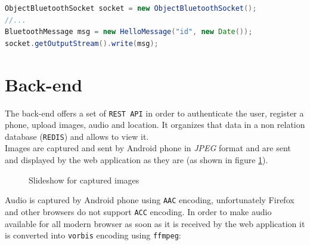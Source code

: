 \documentclass[conference]{IEEEtran}
\begin{document}
\begin{lstlisting}[language=Java, caption=Bluetooth sending of an HelloMessage]
ObjectBluetoothSocket socket = new ObjectBluetoothSocket();
//...
BluetoothMessage msg = new HelloMessage("id", new Date());
socket.getOutputStream().write(msg);

\end{lstlisting}


\section{\textbf{Back-end}}
The back-end offers a set of \texttt{REST API} in order to authenticate the user, register a phone, upload images, audio and location. It organizes that data in a non relation database (\texttt{REDIS}) and allows to view it.\\

Images are captured and sent by Android phone in \textit{JPEG} format and are sent and displayed by the web application as they are (as shown in figure \ref{img:slideshow}).\\

\begin{figure}[!ht]
\begin{center}
\caption{Slideshow for captured images}
\label{img:slideshow}
\end{center}
\end{figure}

Audio is captured by Android phone using \texttt{AAC} encoding, unfortunately Firefox and other browsers do not support \texttt{ACC} encoding. In order to make audio available for all modern browser as soon as it is received by the web application it is converted into \texttt{vorbis} encoding using \texttt{ffmpeg}:
\end{document}
